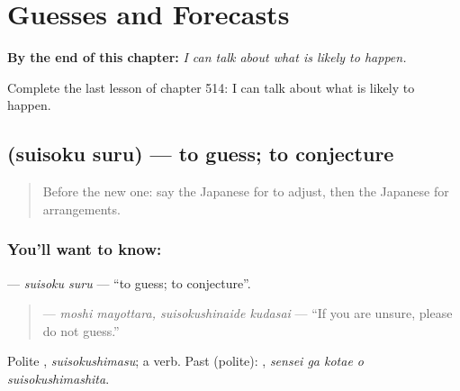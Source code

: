 
\chapter{Guesses and Forecasts}
\label{ch:ja-guesses-and-forecasts}

\begin{chapteropening}
\textbf{By the end of this chapter:} \emph{I can talk about what is likely to happen.}

Complete the last lesson of chapter 514: I can talk about what is likely to happen.
\end{chapteropening}

\section[\texorpdfstring{\ja{すいそくする} (suisoku suru)}{すいそくする (suisoku suru)}]{ (suisoku suru) — to guess; to conjecture}

\label{lesson:JA-C514-suisoku-suru}



\begin{quote}
Before the new one: say the Japanese for to adjust, then the Japanese for arrangements.
\end{quote}

\subsection*{You'll want to know: }
\textbf{} — \emph{suisoku suru} — \textquotedblleft{}to guess; to conjecture\textquotedblright{}.

\begin{quote}
\textbf{  } — \emph{moshi mayottara, suisokushinaide kudasai} — \textquotedblleft{}If you are unsure, please do not guess.\textquotedblright{}
\end{quote}

Polite \textbf{}, \emph{suisokushimasu}; a  verb. Past (polite): \textbf{  }, \emph{sensei ga kotae o suisokushimashita}.

